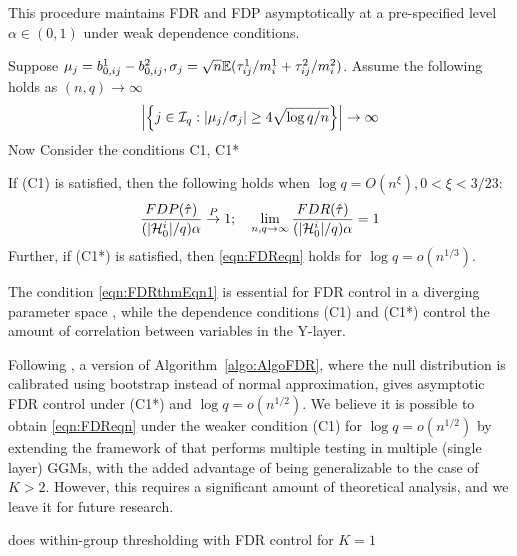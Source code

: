 \documentclass[12pt, letterpaper]{article}
\numberwithin{equation}{section}
\begin{document}
This procedure maintains FDR and FDP asymptotically at a pre-specified level $\alpha \in (0,1)$  under weak dependence conditions.

\begin{Theorem}\label{thm:FDRthm}
Suppose $\mu_j = b_{0,ij}^1 - b_{0,ij}^2, \sigma_j = \sqrt n {\mathbb{E}} (\tau_{ij}^1/ m_i^1 + \tau_{ij}^2/ m_i^2)$. Assume the following holds as $(n,q) \rightarrow \infty$
%
\begin{align}\label{eqn:FDRthmEqn1}
\left| \left\{ j \in {\cal{I}}_q: |\mu_j / \sigma_j | \geq
4 \sqrt{ \log q/n} \right\} \right| \rightarrow \infty
\end{align}
%
Now Consider the conditions {\colrbf C1, C1*}


If (C1) is satisfied, then the following holds when $\log q = O(n^{\xi}), 0 < \xi < 3/23$:
%
\begin{align}\label{eqn:FDReqn}
\frac{FDP( \hat \tau)}{(| {\cal{H}}_0^i|/q) \alpha} \stackrel{P}{\rightarrow} 1; \quad
\lim_{n, q \rightarrow \infty} \frac{FDR( \hat \tau)}{(| {\cal{H}}_0^i|/q) \alpha} = 1
\end{align}
%
Further, if (C1*) is satisfied, then \eqref{eqn:FDReqn} holds for $\log q = o(n^{1/3})$.
\end{Theorem}
%
The condition \eqref{eqn:FDRthmEqn1} is essential for FDR control in a diverging parameter space \citep{LiuShao14, Liu17}, while the dependence conditions (C1) and (C1*) control the amount of correlation between variables in the Y-layer.

\begin{Remark}
Following \cite{LiuShao14}, a version of Algorithm~\ref{algo:AlgoFDR}, where the null distribution is calibrated using bootstrap instead of normal approximation, gives asymptotic FDR control under (C1*) and $\log q = o(n^{1/2})$. We believe it is possible to obtain \eqref{eqn:FDReqn} under the weaker condition (C1) for $ \log q = o(n^{1/2})$ by extending the framework of \cite{Liu17} that performs multiple testing in multiple (single layer) GGMs, with the added advantage of being generalizable to the case of $K > 2$. However, this requires a significant amount of theoretical analysis, and we leave it for future research.
\end{Remark}

\begin{Remark}
{\colrbf does within-group thresholding with FDR control for $K=1$}
\end{Remark}
\end{document}

